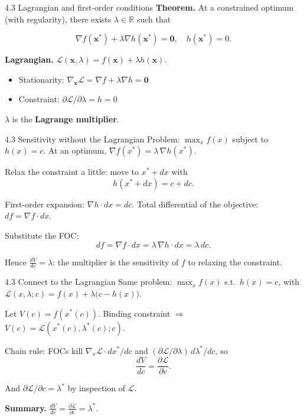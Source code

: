 \documentclass[11pt,aspectratio=169]{beamer}
\begin{document}
\begin{frame}{4.3 Lagrangian and first-order conditions}
  \small
  \textbf{Theorem.} At a constrained optimum (with regularity), there exists $\lambda \in \mathbb{R}$ such that
  
  \[
    \nabla f(\mathbf{x}^*) + \lambda \nabla h(\mathbf{x}^*) = \mathbf{0}, \quad h(\mathbf{x}^*) = 0.
  \]
  
  \textbf{Lagrangian.} $\mathcal{L}(\mathbf{x}, \lambda) = f(\mathbf{x}) + \lambda h(\mathbf{x})$.
  
  \begin{itemize}
    \item Stationarity: $\nabla_{\mathbf{x}} \mathcal{L} = \nabla f + \lambda \nabla h = \mathbf{0}$
    
    \item Constraint: $\partial \mathcal{L}/\partial \lambda = h = 0$
  \end{itemize}
  
  $\lambda$ is the \textbf{Lagrange multiplier}.
\end{frame}

\begin{frame}{4.3 Sensitivity without the Lagrangian}
  \small
  Problem: $\max_x f(x)$ subject to $h(x)=c$. At an optimum, $\nabla f(x^*)=\lambda\,\nabla h(x^*)$.
  
  Relax the constraint a little: move to $x^*+dx$ with
  \[
    h(x^*+dx)=c+dc.
  \]
  
  First-order expansion: $\nabla h\cdot dx=dc$. Total differential of the objective: $df=\nabla f\cdot dx$.
  
  Substitute the FOC:
  \[
    df=\nabla f\cdot dx=\lambda\,\nabla h\cdot dx=\lambda\,dc.
  \]
  
  Hence $\displaystyle\frac{dV}{dc}=\lambda$: the multiplier is the sensitivity of $f$ to relaxing the constraint.
\end{frame}

\begin{frame}{4.3 Connect to the Lagrangian}
  \small
  Same problem: $\max_x f(x)$ s.t.\ $h(x)=c$, with $\mathcal{L}(x,\lambda;c)=f(x)+\lambda\bigl(c-h(x)\bigr)$.
  
  Let $V(c)=f(x^*(c))$. Binding constraint $\Rightarrow$ $V(c)=\mathcal{L}(x^*(c),\lambda^*(c);c)$.
  
  Chain rule: FOCs kill $\nabla_x\mathcal{L}\cdot dx^*/dc$ and $(\partial\mathcal{L}/\partial\lambda)\,d\lambda^*/dc$, so
  \[
    \frac{dV}{dc}=\frac{\partial\mathcal{L}}{\partial c}.
  \]
  
  And $\partial\mathcal{L}/\partial c=\lambda^*$ by inspection of $\mathcal{L}$.
  
  \textbf{Summary.} $\displaystyle\frac{dV}{dc}=\frac{\partial\mathcal{L}}{\partial c}=\lambda^*$.
\end{frame}
\end{document}
